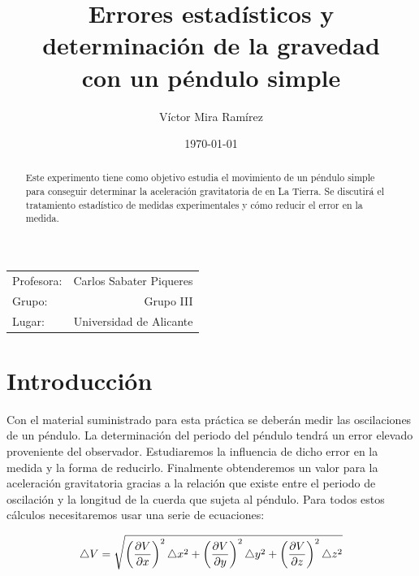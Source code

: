 \documentclass{article}
\title{\textbf{Errores estadísticos y \\ determinación de la gravedad \\ con un péndulo simple}} %
\author{Víctor Mira Ramírez} %
\date{\today} %
\begin{document}
\maketitle %

\begin{center}
\begin{tabular}{l r}

Profesora: & Carlos Sabater Piqueres\\
Grupo: & Grupo III \\
Lugar: & Universidad de Alicante
\end{tabular}
\end{center}

\tableofcontents


\begin{abstract}
Este experimento tiene como objetivo estudia el movimiento de un péndulo simple para conseguir determinar la aceleración gravitatoria de en La Tierra. Se discutirá el tratamiento estadístico de medidas experimentales y cómo reducir el error en la medida.
\end{abstract}
\pagebreak

\section{Introducción}
Con el material suministrado para esta práctica se deberán medir las oscilaciones de un péndulo. La determinación
del periodo del péndulo tendrá un error elevado proveniente del observador. Estudiaremos la
influencia de dicho error en la medida y la forma de reducirlo. Finalmente obtenderemos un valor para la aceleración gravitatoria gracias a la relación que existe entre el periodo de oscilación y la longitud de la cuerda que sujeta al péndulo. Para todos estos cálculos necesitaremos usar una serie de ecuaciones:

\begin{equation}\label{eq:derivadas parciales}
    \centering
    \triangle{V} = \sqrt{\left(\frac{\partial{V}}{\partial{x}}\right)^2 \triangle{x}^2 + \left(\frac{\partial{V}}{\partial{y}}\right)^2 \triangle{y}^2 + \left(\frac{\partial{V}}{\partial{z}}\right)^2 \triangle{z}^2 }
\end{equation}

\vspace{0.3cm}
\end{document}
